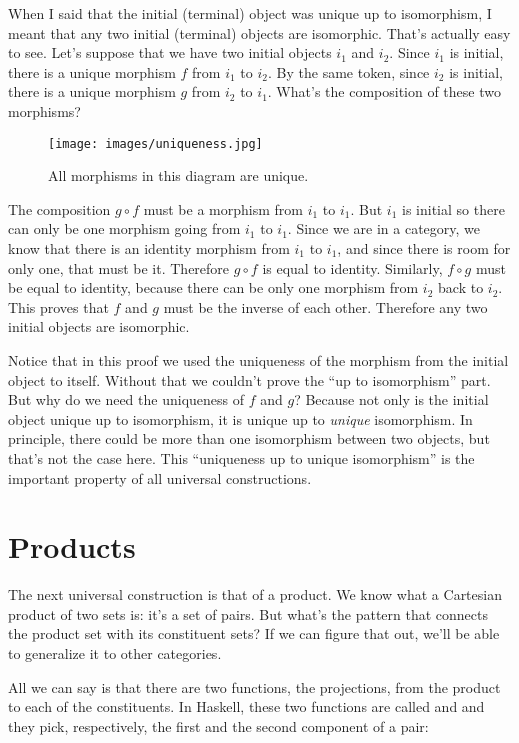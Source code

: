 When I said that the initial (terminal) object was unique up to
isomorphism, I meant that any two initial (terminal) objects are
isomorphic. That's actually easy to see. Let's suppose that we have two
initial objects $i_{1}$ and $i_{2}$. Since
$i_{1}$ is initial, there is a unique morphism $f$ from
$i_{1}$ to $i_{2}$. By the same token, since
$i_{2}$ is initial, there is a unique morphism $g$ from
$i_{2}$ to $i_{1}$. What's the composition of
these two morphisms?

\begin{figure}[H]
  \centering
  \texttt{[image: images/uniqueness.jpg]}
  \caption{All morphisms in this diagram are unique.}
\end{figure}

\noindent
The composition $g \circ f$ must be a morphism from $i_{1}$ to
$i_{1}$. But $i_{1}$ is initial so there can only
be one morphism going from $i_{1}$ to $i_{1}$.
Since we are in a category, we know that there is an identity morphism
from $i_{1}$ to $i_{1}$, and since there is room
for only one, that must be it. Therefore $g \circ f$ is equal to
identity. Similarly, $f \circ g$ must be equal to identity, because there
can be only one morphism from $i_{2}$ back to
$i_{2}$. This proves that $f$ and $g$ must be the
inverse of each other. Therefore any two initial objects are isomorphic.

Notice that in this proof we used the uniqueness of the morphism from
the initial object to itself. Without that we couldn't prove the ``up to
isomorphism'' part. But why do we need the uniqueness of $f$ and
$g$? Because not only is the initial object unique up to
isomorphism, it is unique up to \emph{unique} isomorphism. In principle,
there could be more than one isomorphism between two objects, but that's
not the case here. This ``uniqueness up to unique isomorphism'' is the
important property of all universal constructions.

\section{Products}

The next universal construction is that of a product. We know what a
Cartesian product of two sets is: it's a set of pairs. But what's the
pattern that connects the product set with its constituent sets? If we
can figure that out, we'll be able to generalize it to other categories.

All we can say is that there are two functions, the projections, from
the product to each of the constituents. In Haskell, these two functions
are called  and  and they pick, respectively,
the first and the second component of a pair:

